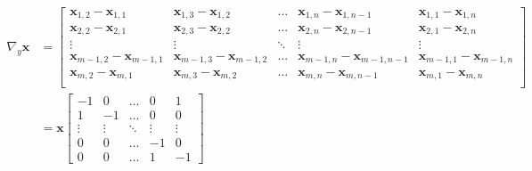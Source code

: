 \documentclass[12pt]{article}
\begin{document}
\begin{equation}
  \begin{aligned}
  \nabla_{y} \mathbf{x} &= \begin{bmatrix}
    \mathbf{x}_{1,2} - \mathbf{x}_{1,1} & \mathbf{x}_{1,3} - \mathbf{x}_{1,2} & \ldots & \mathbf{x}_{1,n} - \mathbf{x}_{1,n-1} & \mathbf{x}_{1,1} - \mathbf{x}_{1,n} \\
    \mathbf{x}_{2,2} - \mathbf{x}_{2,1} & \mathbf{x}_{2,3} - \mathbf{x}_{2,2} & \ldots & \mathbf{x}_{2,n} - \mathbf{x}_{2,n-1} & \mathbf{x}_{2,1} - \mathbf{x}_{2,n}  \\
    \vdots & \vdots & \ddots & \vdots & \vdots \\
    \mathbf{x}_{m-1,2} - \mathbf{x}_{m-1,1} & \mathbf{x}_{m-1,3} - \mathbf{x}_{m-1,2} & \ldots & \mathbf{x}_{m-1,n} - \mathbf{x}_{m-1,n-1} & \mathbf{x}_{m-1,1} - \mathbf{x}_{m-1,n} \\
    \mathbf{x}_{m,2} - \mathbf{x}_{m,1} & \mathbf{x}_{m,3} - \mathbf{x}_{m,2} & \ldots & \mathbf{x}_{m,n} - \mathbf{x}_{m,n-1} & \mathbf{x}_{m,1} - \mathbf{x}_{m,n} \\
  \end{bmatrix} \\
  &=  \mathbf{x} \begin{bmatrix}
    -1 & 0 & \ldots & 0 & 1 \\
    1 & -1 & \ldots & 0 & 0 \\
    \vdots & \vdots & \ddots & \vdots & \vdots \\
    0 & 0 & \ldots & -1 & 0 \\
    0 & 0 & \ldots & 1 & -1
    \end{bmatrix}
  \end{aligned}
\end{equation}







\end{document}
